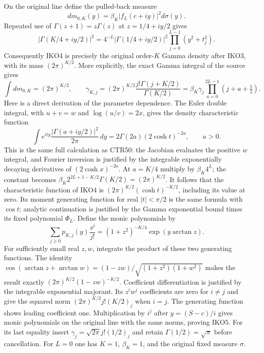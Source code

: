 On the original line define the pulled-back measure
\[
 dm_{0,K}(y)=\beta_K|f_L(c+iy)|^2d\sigma(y).
 \tag{IKO4}
\]
Repeated use of $\Gamma(z+1)=z\Gamma(z)$ at
$z=1/4+iy/2$ gives
\[
 |\Gamma(K/4+iy/2)|^2
     =4^{-L}|\Gamma(1/4+iy/2)|^2
                    \prod_{j=0}^{L-1}(y^2+t_j^2).
\]
Consequently IKO4 is precisely the original order-$K$ Gamma density
after IKO3, with its mass $(2\pi)^{K/2}$. More explicitly, the exact
Gamma integral of the source gives
\[
 \int dm_{0,K}=(2\pi)^{K/2},\qquad
 \gamma_{K,j}=(2\pi)^{K/2}
            \frac{j!\Gamma(j+K/2)}{\Gamma(K/2)}
      =\beta_K\gamma_j\prod_{a=0}^{2L-1}(j+a+\tfrac12).
 \tag{IKO5}
\]
Here is a direct derivation of the parameter dependence. The Euler
double integral, with $u+v=w$ and $\log(u/v)=2x$, gives the density
characteristic function
\[
 \int e^{ity}\frac{|\Gamma(a+iy/2)|^2}{2\pi}\,dy
      =2\Gamma(2a)(2\cosh t)^{-2a},\qquad a>0.
\]
This is the same full calculation as CTR50: the Jacobian evaluates
the positive $w$ integral, and Fourier inversion is justified by the
integrable exponentially decaying derivatives of $(2\cosh x)^{-2a}$.
At $a=K/4$ multiply by $\beta_K4^L$; the constant becomes
$\beta_K2^{2L+1-K/2}\Gamma(K/2)=(2\pi)^{K/2}$.
It follows that the characteristic function of IKO4 is
$(2\pi)^{K/2}(\cosh t)^{-K/2}$, including its value at zero.
Its moment generating function for real $|t|<\pi/2$ is the same
formula with $\cos t$; analytic continuation is justified by the
Gamma exponential bound times its fixed polynomial $\Phi_L$.
Define the monic polynomials by
\[
 \sum_{j\geq0}p_{K,j}(y)\frac{z^j}{j!}
       =(1+z^2)^{-K/4}\exp(y\arctan z).
\]
For sufficiently small real $z,w$, integrate the product of these
two generating functions. The identity
$\cos(\arctan z+\arctan w)=(1-zw)/
\sqrt{(1+z^2)(1+w^2)}$ makes the result exactly
$(2\pi)^{K/2}(1-zw)^{-K/2}$.
Coefficient differentiation is justified by the integrable exponential
majorant. Its $z^iw^j$ coefficients are zero for $i\ne j$ and give
the squared norm $(2\pi)^{K/2}j!(K/2)_j$ when $i=j$.
The generating function shows leading coefficient one. Multiplication
by $i^j$ after $y=(S-c)/i$ gives monic polynomials on the original
line with the same norms, proving IKO5. For its last equality insert
$\gamma_j=\sqrt{2\pi}j!(1/2)_j$ and retain
$\Gamma(1/2)=\sqrt\pi$ before cancellation.
For $L=0$ one has $K=1$,
$\beta_K=1$, and the original fixed measure $\sigma$.

